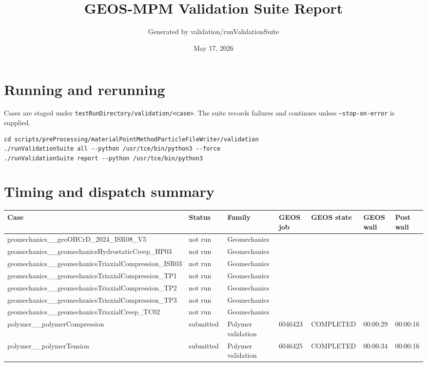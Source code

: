 \documentclass[10pt]{article}
\begin{document}
\title{GEOS-MPM Validation Suite Report}
\author{Generated by validation/runValidationSuite}
\date{May 17, 2026}
\maketitle
\section*{Running and rerunning}
Cases are staged under \texttt{testRunDirectory/validation/<case>}. The suite records failures and continues unless \texttt{--stop-on-error} is supplied.
\begin{verbatim}
cd scripts/preProcessing/materialPointMethodParticleFileWriter/validation
./runValidationSuite all --python /usr/tce/bin/python3 --force
./runValidationSuite report --python /usr/tce/bin/python3
\end{verbatim}
\section*{Timing and dispatch summary}
\small
\begin{longtable}{p{0.27\linewidth}p{0.13\linewidth}p{0.18\linewidth}p{0.11\linewidth}p{0.14\linewidth}p{0.09\linewidth}p{0.09\linewidth}}
\toprule Case & Status & Family & GEOS job & GEOS state & GEOS wall & Post wall \\ \midrule\endhead
geomechanics\_\_geoOHCrD\_2024\_ISR08\_V5 & not run & Geomechanics &  &  &  &  \\
geomechanics\_\_geomechanicsHydrostaticCreep\_HP03 & not run & Geomechanics &  &  &  &  \\
geomechanics\_\_geomechanicsTriaxialCompression\_ISR03 & not run & Geomechanics &  &  &  &  \\
geomechanics\_\_geomechanicsTriaxialCompression\_TP1 & not run & Geomechanics &  &  &  &  \\
geomechanics\_\_geomechanicsTriaxialCompression\_TP2 & not run & Geomechanics &  &  &  &  \\
geomechanics\_\_geomechanicsTriaxialCompression\_TP3 & not run & Geomechanics &  &  &  &  \\
geomechanics\_\_geomechanicsTriaxialCreep\_TC02 & not run & Geomechanics &  &  &  &  \\
polymer\_\_polymerCompression & submitted & Polymer validation & 6046423 & COMPLETED & 00:00:29 & 00:00:16 \\
polymer\_\_polymerTension & submitted & Polymer validation & 6046425 & COMPLETED & 00:00:34 & 00:00:16 \\
\bottomrule
\end{longtable}
\normalsize
\clearpage
\end{document}
